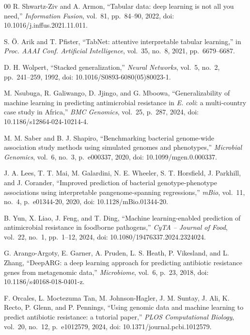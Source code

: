 \documentclass[conference]{IEEEtran}
\begin{document}
\begin{thebibliography}{00}
 R. Shwartz-Ziv and A. Armon, ``Tabular data: deep learning is not all you need,'' \textit{Information Fusion}, vol.~81, pp.~84--90, 2022, doi: 10.1016/j.inffus.2021.11.011.

 S. \"{O}. Arik and T. Pfister, ``TabNet: attentive interpretable tabular learning,'' in \textit{Proc. AAAI Conf. Artificial Intelligence}, vol.~35, no.~8, 2021, pp.~6679--6687.

 D. H. Wolpert, ``Stacked generalization,'' \textit{Neural Networks}, vol.~5, no.~2, pp.~241--259, 1992, doi: 10.1016/S0893-6080(05)80023-1.

 M. Nsubuga, R. Galiwango, D. Jjingo, and G. Mboowa, ``Generalizability of machine learning in predicting antimicrobial resistance in \textit{E. coli}: a multi-country case study in Africa,'' \textit{BMC Genomics}, vol.~25, p.~287, 2024, doi: 10.1186/s12864-024-10214-4.

 M. M. Saber and B. J. Shapiro, ``Benchmarking bacterial genome-wide association study methods using simulated genomes and phenotypes,'' \textit{Microbial Genomics}, vol.~6, no.~3, p.~e000337, 2020, doi: 10.1099/mgen.0.000337.

 J. A. Lees, T. T. Mai, M. Galardini, N. E. Wheeler, S. T. Horsfield, J. Parkhill, and J. Corander, ``Improved prediction of bacterial genotype-phenotype associations using interpretable pangenome-spanning regressions,'' \textit{mBio}, vol.~11, no.~4, p.~e01344-20, 2020, doi: 10.1128/mBio.01344-20.

 B. Yun, X. Liao, J. Feng, and T. Ding, ``Machine learning-enabled prediction of antimicrobial resistance in foodborne pathogens,'' \textit{CyTA -- Journal of Food}, vol.~22, no.~1, pp.~1--12, 2024, doi: 10.1080/19476337.2024.2324024.

 G. Arango-Argoty, E. Garner, A. Pruden, L. S. Heath, P. Vikesland, and L. Zhang, ``DeepARG: a deep learning approach for predicting antibiotic resistance genes from metagenomic data,'' \textit{Microbiome}, vol.~6, p.~23, 2018, doi: 10.1186/s40168-018-0401-z.

 F. Orcales, L. Moctezuma Tan, M. Johnson-Hagler, J. M. Suntay, J. Ali, K. Recto, P. Glenn, and P. Pennings, ``Using genomic data and machine learning to predict antibiotic resistance: a tutorial paper,'' \textit{PLOS Computational Biology}, vol.~20, no.~12, p.~e1012579, 2024, doi: 10.1371/journal.pcbi.1012579.


\end{thebibliography}
\end{document}
